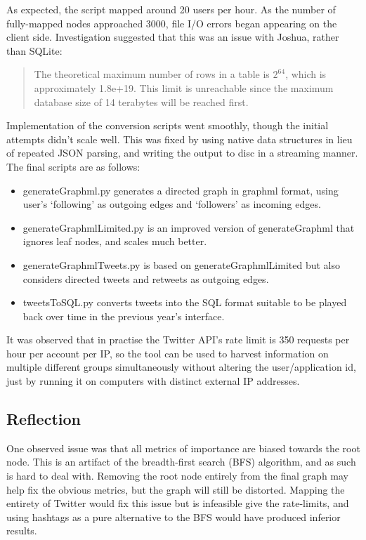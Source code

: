 As expected, the script mapped around 20 users per hour. As the number of fully-mapped nodes approached 3000, file I/O errors began appearing on the client side. Investigation suggested that this was an issue with Joshua, rather than SQLite:

\begin{quote}
The theoretical maximum number of rows in a table is $2^{64}$, which is approximately 1.8e+19. This limit is unreachable since the maximum database size of 14 terabytes will be reached first.
\end{quote}
\cite{sqliteLimits}

Implementation of the conversion scripts went smoothly, though the initial attempts didn't scale well. This was fixed by using native data structures in lieu of repeated JSON parsing, and writing the output to disc in a streaming manner. The final scripts are as follows:
\begin{itemize}
\item generateGraphml.py generates a directed graph in graphml format, using user's `following' as outgoing edges and ‘followers' as incoming edges.
\item generateGraphmlLimited.py is an improved version of generateGraphml that ignores leaf nodes, and scales much better.
\item generateGraphmlTweets.py is based on generateGraphmlLimited but also considers directed tweets and retweets as outgoing edges.
\item tweetsToSQL.py converts tweets into the SQL format suitable to be played back over time in the previous year's interface.
\end{itemize}

It was observed that in practise the Twitter API's rate limit is 350 requests per hour per account per IP, so the tool can be used to harvest information on multiple different groups simultaneously without altering the user/application id, just by running it on computers with distinct external IP addresses.

\subsection{Reflection}
One observed issue was that all metrics of importance are biased towards the root node. This is an artifact of the breadth-first search (BFS) algorithm, and as such is hard to deal with. Removing the root node entirely from the final graph may help fix the obvious metrics, but the graph will still be distorted. Mapping the entirety of Twitter would fix this issue but is infeasible give the rate-limits, and using hashtags as a pure alternative to the BFS would have produced inferior results.


